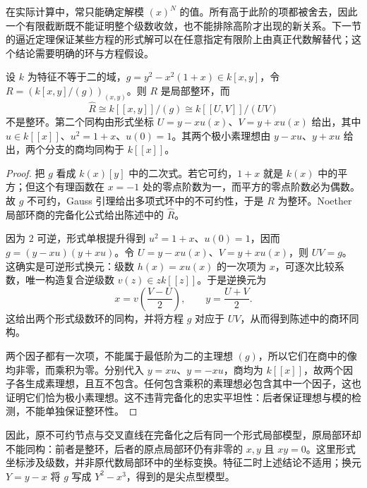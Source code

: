在实际计算中，常只能确定解模 \((x)^N\) 的值。所有高于此阶的项都被舍去，因此一个有限截断既不能证明整个级数收敛，也不能排除高阶才出现的新关系。下一节的逼近定理保证某些方程的形式解可以在任意指定有限阶上由真正代数解替代；这个结论需要明确的环与方程假设。


\begin{proposition}\label{b3:prop:node-completion-branches}
	设 \(k\) 为特征不等于二的域，\(g=y^2-x^2(1+x)\in k[x,y]\)，令 \(R=(k[x,y]/(g))_{(x,y)}\)。则 \(R\) 是局部整环，而
	\[
		\widehat R\cong k[\![x,y]\!]/(g) \cong k[\![U,V]\!]/(UV)
	\]
	不是整环。第二个同构由形式坐标 \(U=y-xu(x)\)、\(V=y+xu(x)\) 给出，其中 \(u\in k[\![x]\!]\)、\(u^2=1+x\)、\(u(0)=1\)。其两个极小素理想由 \(y-xu\)、\(y+xu\) 给出，两个分支的商均同构于 \(k[\![x]\!]\)。
\end{proposition}
\begin{proof}
	把 \(g\) 看成 \(k(x)[y]\) 中的二次式。若它可约，\(1+x\) 就是 \(k(x)\) 中的平方；但这个有理函数在 \(x=-1\) 处的零点阶数为一，而平方的零点阶数必为偶数。故 \(g\) 不可约，Gauss 引理给出多项式环中的不可约性，于是 \(R\) 为整环。Noether 局部环商的完备化公式给出陈述中的 \(\widehat R\)。

	因为 \(2\) 可逆，形式单根提升得到 \(u^2=1+x\)、\(u(0)=1\)，因而 \(g=(y-xu)(y+xu)\)。令 \(U=y-xu(x)\)、\(V=y+xu(x)\)，则 \(UV=g\)。这确实是可逆形式换元：级数 \(h(x)=xu(x)\) 的一次项为 \(x\)，可逐次比较系数，唯一构造复合逆级数 \(v(z)\in zk[\![z]\!]\)。于是逆换元为
	\[
		x=v\left(\frac{V-U}{2}\right),\qquad y=\frac{U+V}{2}.
	\]
	这给出两个形式级数环的同构，并将方程 \(g\) 对应于 \(UV\)，从而得到陈述中的商环同构。

	两个因子都有一次项，不能属于最低阶为二的主理想 \((g)\)，所以它们在商中的像均非零，而乘积为零。分别代入 \(y=xu\)、\(y=-xu\)，商均为 \(k[\![x]\!]\)，故两个因子各生成素理想，且互不包含。任何包含乘积的素理想必包含其中一个因子，这也证明它们恰为极小素理想。这不违背完备化的忠实平坦性：后者保证理想与模的检测，不能单独保证整环性。
\end{proof}

因此，原不可约节点与交叉直线在完备化之后有同一个形式局部模型，原局部环却不能同构：前者是整环，后者的原点局部环仍有非零的 \(x,y\) 且 \(xy=0\)。这里形式坐标涉及级数，并非原代数局部环中的坐标变换。特征二时上述结论不适用；换元 \(Y=y-x\) 将 \(g\) 写成 \(Y^2-x^3\)，得到的是尖点型模型。
